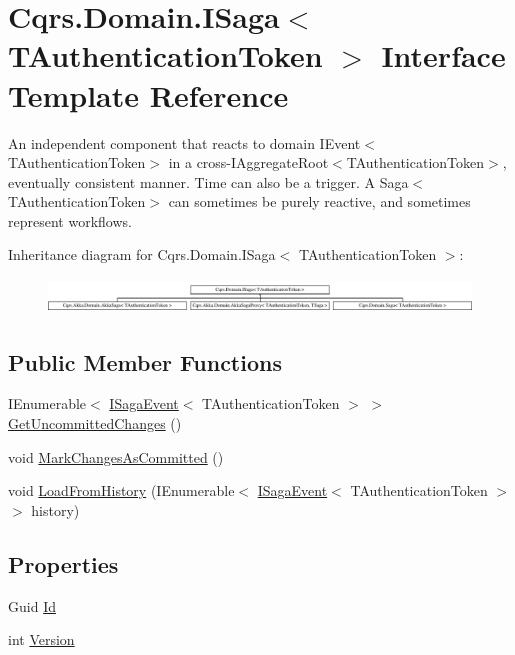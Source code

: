\hypertarget{interfaceCqrs_1_1Domain_1_1ISaga}{}\section{Cqrs.\+Domain.\+I\+Saga$<$ T\+Authentication\+Token $>$ Interface Template Reference}
\label{interfaceCqrs_1_1Domain_1_1ISaga}


An independent component that reacts to domain I\+Event$<$\+T\+Authentication\+Token$>$ in a cross-\/I\+Aggregate\+Root$<$\+T\+Authentication\+Token$>$, eventually consistent manner. Time can also be a trigger. A Saga$<$\+T\+Authentication\+Token$>$ can sometimes be purely reactive, and sometimes represent workflows.  


Inheritance diagram for Cqrs.\+Domain.\+I\+Saga$<$ T\+Authentication\+Token $>$\+:\begin{figure}[H]
\begin{center}
\leavevmode
\includegraphics[height=0.915033cm]{interfaceCqrs_1_1Domain_1_1ISaga}
\end{center}
\end{figure}
\subsection*{Public Member Functions}
\begin{DoxyCompactItemize}
\item 
I\+Enumerable$<$ \hyperlink{interfaceCqrs_1_1Events_1_1ISagaEvent}{I\+Saga\+Event}$<$ T\+Authentication\+Token $>$ $>$ \hyperlink{interfaceCqrs_1_1Domain_1_1ISaga_abb77811b4f7d19adb61f9d33da18e7e0}{Get\+Uncommitted\+Changes} ()
\item 
void \hyperlink{interfaceCqrs_1_1Domain_1_1ISaga_a85c75f80bc5be4bad7f1d9f1231bfba7}{Mark\+Changes\+As\+Committed} ()
\item 
void \hyperlink{interfaceCqrs_1_1Domain_1_1ISaga_a2714804684bc65cf4dec79b4697b9b21}{Load\+From\+History} (I\+Enumerable$<$ \hyperlink{interfaceCqrs_1_1Events_1_1ISagaEvent}{I\+Saga\+Event}$<$ T\+Authentication\+Token $>$$>$ history)
\end{DoxyCompactItemize}
\subsection*{Properties}
\begin{DoxyCompactItemize}
\item 
Guid \hyperlink{interfaceCqrs_1_1Domain_1_1ISaga_aa470a39d3bcdc506dbd5bf49d127bc3c}{Id}
\item 
int \hyperlink{interfaceCqrs_1_1Domain_1_1ISaga_a83a02ff45543d670356dde4149cdc614}{Version}
\end{DoxyCompactItemize}



